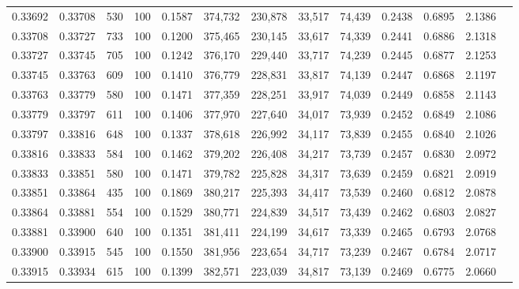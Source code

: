 \begin{tabular}{rrrrrrrrrrrrr}
0.33692 & 0.33708 &   530 & 100 &                                     0.1587 & 374,732 & 230,878 &  33,517 &  74,439 & 0.2438 & 0.6895 & 2.1386 \\
0.33708 & 0.33727 &   733 & 100 &                                     0.1200 & 375,465 & 230,145 &  33,617 &  74,339 & 0.2441 & 0.6886 & 2.1318 \\
0.33727 & 0.33745 &   705 & 100 &                                     0.1242 & 376,170 & 229,440 &  33,717 &  74,239 & 0.2445 & 0.6877 & 2.1253 \\
0.33745 & 0.33763 &   609 & 100 &                                     0.1410 & 376,779 & 228,831 &  33,817 &  74,139 & 0.2447 & 0.6868 & 2.1197 \\
0.33763 & 0.33779 &   580 & 100 &                                     0.1471 & 377,359 & 228,251 &  33,917 &  74,039 & 0.2449 & 0.6858 & 2.1143 \\
0.33779 & 0.33797 &   611 & 100 &                                     0.1406 & 377,970 & 227,640 &  34,017 &  73,939 & 0.2452 & 0.6849 & 2.1086 \\
0.33797 & 0.33816 &   648 & 100 &                                     0.1337 & 378,618 & 226,992 &  34,117 &  73,839 & 0.2455 & 0.6840 & 2.1026 \\
0.33816 & 0.33833 &   584 & 100 &                                     0.1462 & 379,202 & 226,408 &  34,217 &  73,739 & 0.2457 & 0.6830 & 2.0972 \\
0.33833 & 0.33851 &   580 & 100 &                                     0.1471 & 379,782 & 225,828 &  34,317 &  73,639 & 0.2459 & 0.6821 & 2.0919 \\
0.33851 & 0.33864 &   435 & 100 &                                     0.1869 & 380,217 & 225,393 &  34,417 &  73,539 & 0.2460 & 0.6812 & 2.0878 \\
0.33864 & 0.33881 &   554 & 100 &                                     0.1529 & 380,771 & 224,839 &  34,517 &  73,439 & 0.2462 & 0.6803 & 2.0827 \\
0.33881 & 0.33900 &   640 & 100 &                                     0.1351 & 381,411 & 224,199 &  34,617 &  73,339 & 0.2465 & 0.6793 & 2.0768 \\
0.33900 & 0.33915 &   545 & 100 &                                     0.1550 & 381,956 & 223,654 &  34,717 &  73,239 & 0.2467 & 0.6784 & 2.0717 \\
0.33915 & 0.33934 &   615 & 100 &                                     0.1399 & 382,571 & 223,039 &  34,817 &  73,139 & 0.2469 & 0.6775 & 2.0660 \\

\end{tabular}
